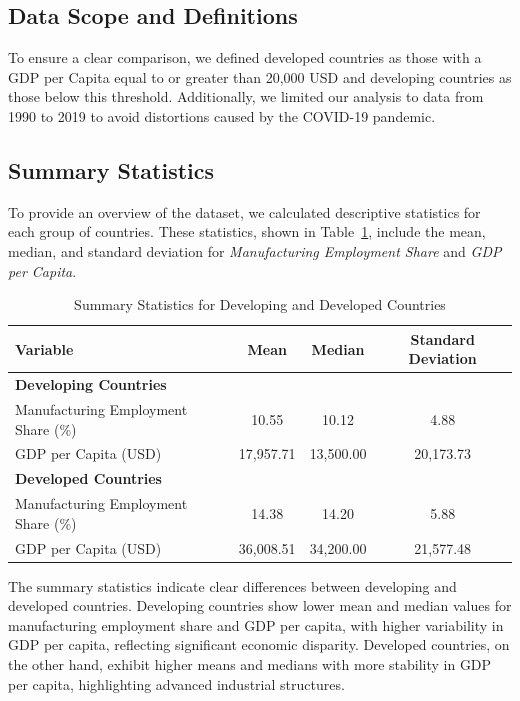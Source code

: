 \documentclass[12pt]{article}
\begin{document}
\subsection{Data Scope and Definitions}
To ensure a clear comparison, we defined developed countries as those with a GDP per Capita equal to or greater than 20,000 USD and developing countries as those below this threshold. Additionally, we limited our analysis to data from 1990 to 2019 to avoid distortions caused by the COVID-19 pandemic.

\subsection{Summary Statistics}
To provide an overview of the dataset, we calculated descriptive statistics for each group of countries. These statistics, shown in Table~\ref{tab:summary-stats}, include the mean, median, and standard deviation for \textit{Manufacturing Employment Share} and \textit{GDP per Capita}.

\begin{table}[h!]
    \centering
    \caption{Summary Statistics for Developing and Developed Countries}
    \label{tab:summary-stats}
    \begin{tabular}{lccc}
        \hline
        \textbf{Variable} & \textbf{Mean} & \textbf{Median} & \textbf{Standard Deviation} \\
        \hline
        \textbf{Developing Countries} & & & \\
        Manufacturing Employment Share (\%) & 10.55 & 10.12 & 4.88 \\
        GDP per Capita (USD) & 17,957.71 & 13,500.00 & 20,173.73 \\
        \hline
        \textbf{Developed Countries} & & & \\
        Manufacturing Employment Share (\%) & 14.38 & 14.20 & 5.88 \\
        GDP per Capita (USD) & 36,008.51 & 34,200.00 & 21,577.48 \\
        \hline
    \end{tabular}
\end{table}

The summary statistics indicate clear differences between developing and developed countries. Developing countries show lower mean and median values for manufacturing employment share and GDP per capita, with higher variability in GDP per capita, reflecting significant economic disparity. Developed countries, on the other hand, exhibit higher means and medians with more stability in GDP per capita, highlighting advanced industrial structures.
\end{document}
